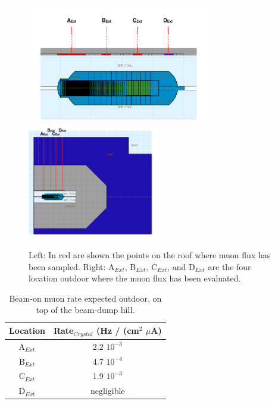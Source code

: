\begin{figure}[h!] 
\center
\includegraphics[width=8.0cm]{figs/DumpTunnelTopBigger1.pdf}
\includegraphics[width=5.7cm]{figs/DumpTunnelTop1.pdf}
\caption {Left: In red are shown the points on the roof  where muon flux has been sampled. Right:  A$_{Ext}$, B$_{Ext}$, C$_{Ext}$,  and D$_{Ext}$ are the four location outdoor where the muon flux has been evaluated.}
\label{fig:bd-top}
\end{figure}


\begin{table}[htp]
\caption{Beam-on muon rate expected outdoor,  on top of the beam-dump hill.}
\begin{center}
\begin{tabular}{|c|c|}
\hline
Location &Rate$_{Crystal} $ (Hz / (cm$^2$ $\mu$A) \\
\hline\hline
A$_{Ext} $ & 2.2 $10^{-3}$\\
 \hline
B$_{Ext} $ & 4.7 $10^{-4}$\\
 \hline
C$_{Ext} $ & 1.9 $10^{-3}$\\
 \hline
D$_{Ext}$ & negligible\\

\hline\hline
\end{tabular}
\end{center}
\label{tab:outside}
\end{table}




